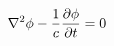 ﻿\documentclass{article}
\begin{document}
\setcounter{equation}{0}
$$
\nabla^2 \phi -{1\over c} {\partial \phi\over \partial t}  = 0
$$
\end{document}
